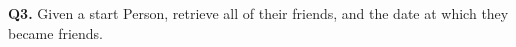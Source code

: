 \textbf{Q3.}
Given a start Person, retrieve all of their friends, and the date at
which they became friends.
